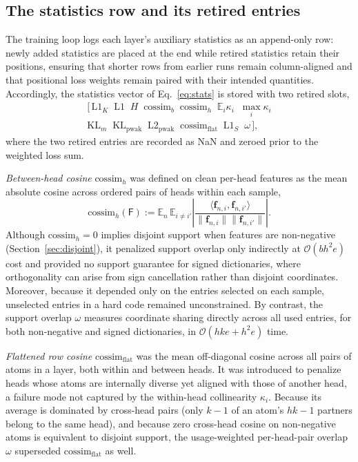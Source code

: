 





\subsection{The statistics row and its retired entries}
\label{app:stats}

The training loop logs each layer's auxiliary statistics as an append-only
row: newly added statistics are placed at the end while retired statistics
retain their positions, ensuring that shorter rows from earlier runs remain
column-aligned and that positional loss weights remain paired with their
intended quantities. Accordingly, the statistics vector of
Eq.~\eqref{eq:stats} is stored with two retired slots,
\[
	\begin{gathered}
	\big[\,
	\mathrm{L1}_K \;\; \mathrm{L1} \;\; H \;\; \mathrm{cossim}_b \;\;
	\mathrm{cossim}_h \;\; \mathbb{E}_i\kappa_i \;\; \max_i \kappa_i
	\\
	\mathrm{KL}_m \;\; \mathrm{KL}_{\mathrm{pwak}} \;\; \mathrm{L2}_{\mathrm{pwak}}
	\;\; \mathrm{cossim}_{\mathrm{flat}} \;\; \mathrm{L1}_S \;\; \omega
	\,\big],
	\end{gathered}
\]
where the two retired entries are recorded as NaN and zeroed prior to the
weighted loss sum.

\emph{Between-head cosine} $\mathrm{cossim}_h$ was defined on clean
per-head features as the mean absolute cosine across ordered pairs of heads
within each sample,
\[
	\mathrm{cossim}_h(\mathsf{F}) :=
	\mathbb{E}_{n}\,\mathbb{E}_{i \neq i'}\left\lvert
	\frac{\langle \mathbf{f}_{n,i}, \mathbf{f}_{n,i'}\rangle}
	     {\lVert \mathbf{f}_{n,i}\rVert \lVert \mathbf{f}_{n,i'}\rVert}
	\right\rvert.
\]
Although $\mathrm{cossim}_h = 0$ implies disjoint support when features are
non-negative (Section~\ref{sec:disjoint}), it penalized support overlap
only indirectly at $\mathcal{O}(bh^2e)$ cost and provided no support
guarantee for signed dictionaries, where orthogonality can arise from sign
cancellation rather than disjoint coordinates. Moreover, because it
depended only on the entries selected on each sample, unselected entries in
a hard code remained unconstrained. By contrast, the support overlap
$\omega$ measures coordinate sharing directly across all used entries, for
both non-negative and signed dictionaries, in $\mathcal{O}(hke + h^2e)$
time.

\emph{Flattened row cosine} $\mathrm{cossim}_{\mathrm{flat}}$ was the mean
off-diagonal cosine across all pairs of atoms in a layer, both within and
between heads. It was introduced to penalize heads whose atoms are
internally diverse yet aligned with those of another head, a failure mode
not captured by the within-head collinearity $\kappa_i$. Because its
average is dominated by cross-head pairs (only $k-1$ of an atom's $hk-1$
partners belong to the same head), and because zero cross-head cosine on
non-negative atoms is equivalent to disjoint support, the usage-weighted
per-head-pair overlap $\omega$ superseded $\mathrm{cossim}_{\mathrm{flat}}$
as well.

